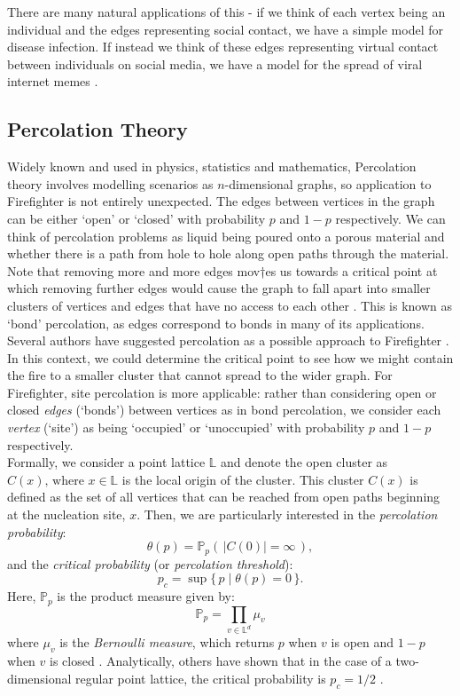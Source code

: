 \documentclass[11pt]{amsart}
\begin{document}
There are many natural applications of this - if we think of each vertex being an individual and the edges representing social contact, we have a simple model for disease infection. If instead we think of these edges representing virtual contact between individuals on social media, we have a model for the spread of viral internet memes \cite{obrien19}.

\subsection{Percolation Theory}

Widely known and used in physics, statistics and mathematics, Percolation theory involves modelling scenarios as $n$-dimensional graphs, so application to Firefighter is not entirely unexpected. The edges between vertices in the graph can be either `open' or `closed' with probability $p$ and $1-p$ respectively. We can think of percolation problems as liquid being poured onto a porous material and whether there is a path from hole to hole along open paths through the material. Note that removing more and more edges mov†es us towards a critical point at which removing further edges would cause the graph to fall apart into smaller clusters of vertices and edges that have no access to each other \cite{grimmett99}. This is known as `bond' percolation, as edges correspond to bonds in many of its applications.\\

Several authors have suggested percolation as a possible approach to Firefighter \cite{finbow09}. In this context, we could determine the critical point to see how we might contain the fire to a smaller cluster that cannot spread to the wider graph. For Firefighter, site percolation is more applicable: rather than considering open or closed \emph{edges} (`bonds') between vertices as in bond percolation, we consider each \emph{vertex} (`site') as being `occupied' or `unoccupied' with probability $p$ and $1-p$ respectively.\\

Formally, we consider a point lattice $\mathbb{L}$ and denote the open cluster as $C(x)\text{,~where~}x\in\mathbb{L}$ is the local origin of the cluster. This cluster $C(x)$ is defined as the set of all vertices that can be reached from open paths beginning at the nucleation site, $x$. Then, we are particularly interested in the \emph{percolation probability}:
$$
\theta(p) = \mathbb{P}_p(\,|C(0)|=\infty\,),
$$
and the \emph{critical probability} (or \emph{percolation threshold}):
$$
p_c = \sup\{\,p \mid \theta(p)=0\,\}.
$$
Here, $\mathbb{P}_p$ is the product measure given by:
$$
\displaystyle \mathbb{P}_p=\prod_{v\in\mathbb{L}^d}\mu_v
$$
where $\mu_v$ is the \emph{Bernoulli measure}, which returns $p$ when $v$ is open and $1-p$ when $v$ is closed \cite[p. 28]{klenke14}. Analytically, others have shown that in the case of a two-dimensional regular point lattice, the critical probability is $p_c=1/2$ \cite{kersten80}.
\end{document}
